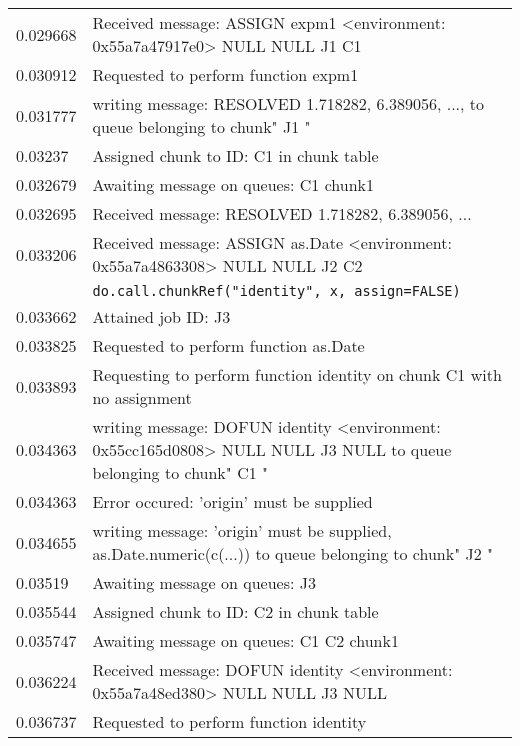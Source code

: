 \documentclass[a4paper,10pt]{article}
\begin{document}
\begin{table}
\begin{tabularx}{\textwidth}{lX}
		0.029668 & \textcolor{\servercolour}{Received message: ASSIGN expm1 <environment: 0x55a7a47917e0> NULL NULL J1 C1} \\
		0.030912 & \textcolor{\servercolour}{Requested to perform function expm1} \\
		0.031777 & \textcolor{\servercolour}{writing message: RESOLVED 1.718282, 6.389056, ..., to queue belonging to chunk" J1 "} \\
		0.03237  & \textcolor{\servercolour}{Assigned chunk to ID: C1 in chunk table} \\
		0.032679 & \textcolor{\servercolour}{Awaiting message on queues: C1     chunk1} \\
		0.032695 & \textcolor{\clientcolour}{Received message: RESOLVED 1.718282, 6.389056, ... } \\
		0.033206 & \textcolor{\servercolour}{Received message: ASSIGN as.Date <environment: 0x55a7a4863308> NULL NULL J2 C2} \\
			 & \textcolor{\clientcolour}{\texttt{do.call.chunkRef("identity", x, assign=FALSE)}} \\
		0.033662 & \textcolor{\clientcolour}{Attained job ID:  J3} \\
		0.033825 & \textcolor{\servercolour}{Requested to perform function as.Date} \\
		0.033893 & \textcolor{\clientcolour}{Requesting to perform function identity on chunk C1 with no assignment} \\
		0.034363 & \textcolor{\clientcolour}{writing message: DOFUN identity <environment: 0x55cc165d0808> NULL NULL J3 NULL to queue belonging to chunk" C1 "} \\
		0.034363 & \textcolor{\servercolour}{Error occured: 'origin' must be supplied} \\
		0.034655 & \textcolor{\servercolour}{writing message: 'origin' must be supplied, as.Date.numeric(c(...)) to queue belonging to chunk" J2 "} \\
		0.03519  & \textcolor{\clientcolour}{Awaiting message on queues: J3} \\
		0.035544 & \textcolor{\servercolour}{Assigned chunk to ID: C2 in chunk table} \\
		0.035747 & \textcolor{\servercolour}{Awaiting message on queues: C1     C2     chunk1} \\
		0.036224 & \textcolor{\servercolour}{Received message: DOFUN identity <environment: 0x55a7a48ed380> NULL NULL J3 NULL} \\
		0.036737 & \textcolor{\servercolour}{Requested to perform function identity} \\

\end{tabularx}
\end{table}
\end{document}
